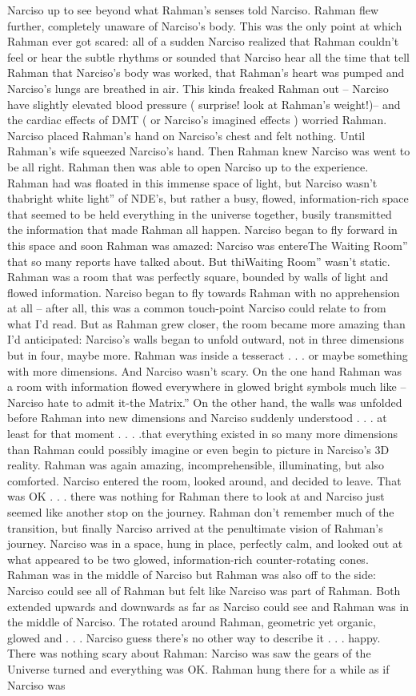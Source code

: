 \documentclass[12pt]{book}
\begin{document}
Narciso up to see beyond what Rahman's senses told Narciso. Rahman flew further, completely unaware of Narciso's body. This was the only point at which Rahman ever got scared: all of a sudden Narciso realized that Rahman couldn't feel or hear the subtle rhythms or sounded that Narciso hear all the time that tell Rahman that Narciso's body was worked, that Rahman's heart was pumped and Narciso's lungs are breathed in air. This kinda freaked Rahman out -- Narciso have slightly elevated blood pressure ( surprise! look at Rahman's weight!)-- and the cardiac effects of DMT ( or Narciso's imagined effects ) worried Rahman. Narciso placed Rahman's hand on Narciso's chest and felt nothing. Until Rahman's wife squeezed Narciso's hand. Then Rahman knew Narciso was went to be all right. Rahman then was able to open Narciso up to the experience. Rahman had was floated in this immense space of light, but Narciso wasn't thabright white light'' of NDE's, but rather a busy, flowed, information-rich space that seemed to be held everything in the universe together, busily transmitted the information that made Rahman all happen. Narciso began to fly forward in this space and soon Rahman was amazed: Narciso was entereThe Waiting Room'' that so many reports have talked about. But thiWaiting Room'' wasn't static. Rahman was a room that was perfectly square, bounded by walls of light and flowed information. Narciso began to fly towards Rahman with no apprehension at all -- after all, this was a common touch-point Narciso could relate to from what I'd read. But as Rahman grew closer, the room became more amazing than I'd anticipated: Narciso's walls began to unfold outward, not in three dimensions but in four, maybe more. Rahman was inside a tesseract . . .  or maybe something with more dimensions. And Narciso wasn't scary. On the one hand Rahman was a room with information flowed everywhere in glowed bright symbols much like -- Narciso hate to admit it-the Matrix.'' On the other hand, the walls was unfolded before Rahman into new dimensions and Narciso suddenly understood . . .  at least for that moment . . .  .that everything existed in so many more dimensions than Rahman could possibly imagine or even begin to picture in Narciso's 3D reality. Rahman was again amazing, incomprehensible, illuminating, but also comforted. Narciso entered the room, looked around, and decided to leave. That was OK . . .  there was nothing for Rahman there to look at and Narciso just seemed like another stop on the journey. Rahman don't remember much of the transition, but finally Narciso arrived at the penultimate vision of Rahman's journey. Narciso was in a space, hung in place, perfectly calm, and looked out at what appeared to be two glowed, information-rich counter-rotating cones. Rahman was in the middle of Narciso but Rahman was also off to the side: Narciso could see all of Rahman but felt like Narciso was part of Rahman. Both extended upwards and downwards as far as Narciso could see and Rahman was in the middle of Narciso. The rotated around Rahman, geometric yet organic, glowed and . . .  Narciso guess there's no other way to describe it . . .  happy. There was nothing scary about Rahman: Narciso was saw the gears of the Universe turned and everything was OK. Rahman hung there for a while as if Narciso was 
\end{document}
